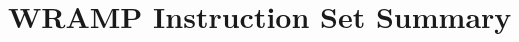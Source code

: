 \documentclass[a4paper,10pt]{article}
\begin{document}
\newcommand{\mem}[1]{[ #1 ]}
\newcommand{\signextend}{\int}

\newcommand{\rtype}[2]
	   { \scriptsize{\texttt{#1 dddd ssss #2 0000 0000 0000 tttt}} } 
\newcommand{\itype}[2]
	   { \scriptsize{\texttt{#1 dddd ssss #2 iiii iiii iiii iiii} } }
\newcommand{\jtype}[3]
	   { \scriptsize{\texttt{#1 #2 #3 aaaa aaaa aaaa aaaa aaaa} } }

\newcommand{\arithmeticinsn}[1]
	   { \scriptsize{$ \regdsm \leftarrow \regssm #1 \regtsm $ } }
\newcommand{\arithmeticinsni}[1]
           { \scriptsize{$ \regdsm \leftarrow \regssm #1 \signextend(immed) $ }
	   }
\newcommand{\arithmeticinsnu}[1]
           { \scriptsize{$ \regdsm \leftarrow \regssm #1 \regtsm $ } }
\newcommand{\arithmeticinsnui}[1]
           { \scriptsize{$ \regdsm \leftarrow \regssm #1 immed $ } }
\newcommand{\lhiinsn}
           { \scriptsize{$ \regdsm \leftarrow immed \ll 16 $} }
\newcommand{\lainsn}
           { \scriptsize{$ \regdsm \leftarrow address $} }
\newcommand{\srainsn}
           { \scriptsize{$ \regdsm \leftarrow \signextend( \regssm\ \gg\ \regtsm\ ) $ } }
\newcommand{\srainsnimm}
           { \scriptsize{$ \regdsm \leftarrow \signextend( \regssm\ \gg\ immed\ ) $ } }
\newcommand{\jumpinsn}[1]
           { \scriptsize{$ PC \leftarrow #1 $} }
\newcommand{\jalinsn}[1]
           { \scriptsize{$ \texttt{\$ra} \leftarrow PC,\ PC \leftarrow #1 $} } 
\newcommand{\specialinsn}[1]
           { \scriptsize{ $ #1 $ } }
\newcommand{\branchinsn}[1]
           { \scriptsize{ $ if(\regssm\ #1\ 0)\ PC\ \leftarrow\ PC + offset $}}
\newcommand{\lwinsn}
           { \scriptsize{ $ \regdsm\ \leftarrow\ MEM[\regssm + offset] $}}
\newcommand{\swinsn}
           { \scriptsize{ $ MEM[\regssm + offset]\ \leftarrow\ \regdsm $}}

\newpage

\section{WRAMP Instruction Set Summary}
\end{document}
